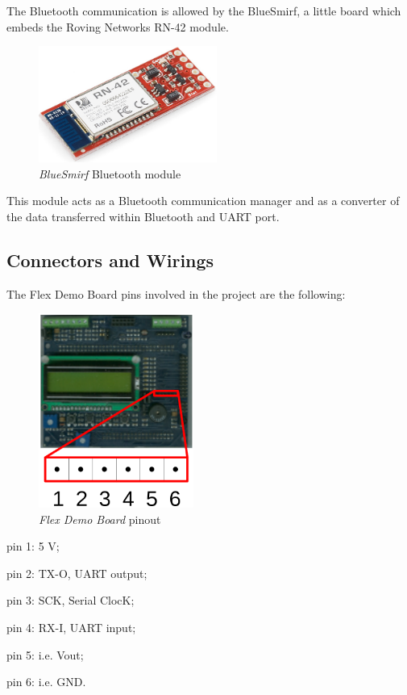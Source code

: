 \documentclass[twoside]{article}
\begin{document}
\begin{multicols}{2}
The Bluetooth communication is allowed by the BlueSmirf, a little board which embeds the Roving Networks RN-42 module.

\begin{figure}[H]
  \centering
  \includegraphics[width=2.3in]{img/bluesmirf_presentation}
  \caption{\textit{BlueSmirf} Bluetooth module}
\end{figure}

This module acts as a Bluetooth communication manager and as a converter of the data transferred within Bluetooth and UART port.

\subsection{Connectors and Wirings}

The Flex Demo Board pins involved in the project are the following:

\begin{figure}[H]
  \centering
  \includegraphics[width=2in]{img/flex_demo_board_pinout}
  \caption{\textit{Flex Demo Board} pinout}
\end{figure}

\begin{compactitem}
\item pin 1: 5 V;
\item pin 2: TX-O, UART output;
\item pin 3: SCK, Serial ClocK;
\item pin 4: RX-I, UART input;
\item pin 5: i.e. Vout;
\item pin 6: i.e. GND.
\end{compactitem}


\end{multicols}
\end{document}
